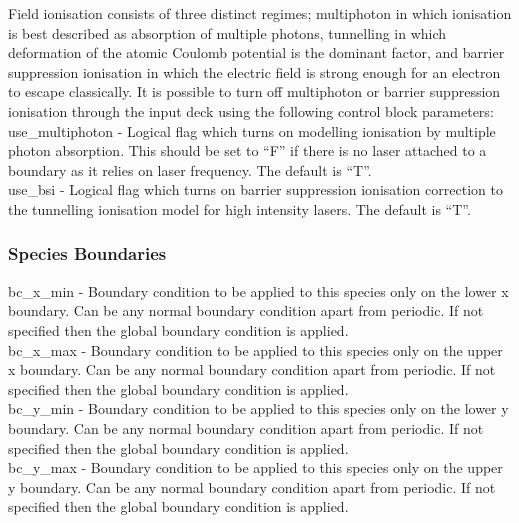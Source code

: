 Field ionisation consists of three distinct regimes; multiphoton in which
ionisation is best described as absorption of multiple photons, tunnelling
in which deformation of the atomic Coulomb potential is the dominant factor,
and barrier suppression ionisation in which the electric field is strong
enough for an electron to escape classically. It is possible to turn off
multiphoton or barrier suppression ionisation through the input deck
using the following control block parameters:\\

{\emphtext use\_multiphoton} - Logical flag which turns on modelling
  ionisation by multiple photon absorption. This should be set to ``F'' if
  there is no laser attached to a boundary as it relies on laser frequency.
  The default is ``T''.\\

{\emphtext use\_bsi} - Logical flag which turns on barrier suppression
  ionisation correction to the tunnelling ionisation model for high intensity
  lasers. The default is ``T''.\\

\subsubsection{Species Boundaries}
\label{sec:per_species_bcs}


{\emphtext bc\_x\_min} - Boundary condition to be applied to this species only
on the lower x boundary. Can be any normal boundary condition apart
from periodic. If not specified then the global boundary condition is applied.\\

{\emphtext bc\_x\_max} - Boundary condition to be applied to this species only
on the upper x boundary. Can be any normal boundary condition apart
from periodic. If not specified then the global boundary condition is applied.\\

{\emphtext bc\_y\_min} - Boundary condition to be applied to this species only
on the lower y boundary. Can be any normal boundary condition apart
from periodic. If not specified then the global boundary condition is applied.\\

{\emphtext bc\_y\_max} - Boundary condition to be applied to this species only
on the upper y boundary. Can be any normal boundary condition apart
from periodic. If not specified then the global boundary condition is applied.\\

